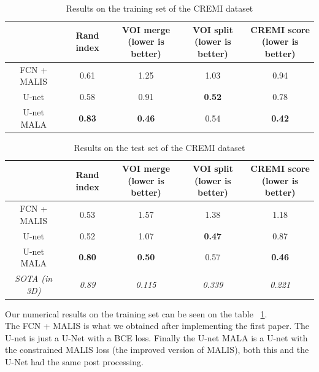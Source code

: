 \begin{table}[!htbp]
	\centering
	\begin{tabular}{|c|c|c|c|c|}
		\hline
		& Rand index & \thead{VOI merge \\(lower is better)} & \thead{VOI split\\(lower is better)} & \thead{CREMI score\\(lower is better)}\\
		\hline
		FCN + MALIS & 0.61 & 1.25 & 1.03 & 0.94\\
		\hline
		U-net & 0.58 & 0.91 & \textbf{0.52} & 0.78\\
		\hline
		U-net MALA & \textbf{0.83} & \textbf{0.46} & 0.54 & \textbf{0.42}\\
		\hline
	\end{tabular}
	\caption{Results on the training set of the CREMI dataset}
\label{tab:cremi_res_train}
\end{table}
\begin{table}[!htbp]
	\centering
	\begin{tabular}{|c|c|c|c|c|}
		\hline
		& Rand index & \thead{VOI merge \\(lower is better)} & \thead{VOI split\\(lower is better)} & \thead{CREMI score\\(lower is better)}\\
		\hline
		FCN + MALIS & 0.53 & 1.57 & 1.38 & 1.18\\
		\hline
		U-net & 0.52 & 1.07 & \textbf{0.47} & 0.87\\
		\hline
		U-net MALA & \textbf{0.80} & \textbf{0.50} & 0.57 & \textbf{0.46}\\
		\hline
		\hline
		\textit{SOTA (in 3D)} & \textit{0.89} & \textit{0.115} & \textit{0.339}& \textit{0.221}\\
		\hline
	\end{tabular}
	\caption{Results on the test set of the CREMI dataset}
\label{tab:cremi_res_test}
\end{table}

Our numerical results on the training set can be seen on the table ~\ref{tab:cremi_res_train}.\\
The FCN + MALIS is what we obtained after implementing the first paper.
The U-net is just a U-Net with a BCE loss.
Finally the U-net MALA is a U-net with the constrained MALIS loss (the improved
version of MALIS), both this and the U-Net had the same post processing.\\

